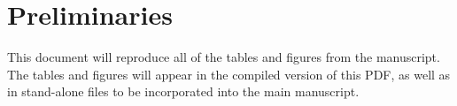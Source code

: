 \documentclass[12pt]{article}
\begin{document}
\section{Preliminaries}

This document will reproduce all of the tables and figures from the
manuscript. The tables and figures will appear in the compiled version
of this PDF, as well as in stand-alone files to be incorporated into
the main manuscript.

\begin{knitrout}
\color{fgcolor}\begin{kframe}
\begin{alltt}
\hlopt{$}\hlstd{(}\hlstd{=}\hlstd{,}\hlstd{=}\hlstd{,}\hlstd{=}\hlstd{,}\hlstd{=}\hlstd{,}\hlstd{=}\hlstd{,}\hlstd{=}\hlstd{)}
\end{alltt}
\end{kframe}
\end{knitrout}
\end{document}
